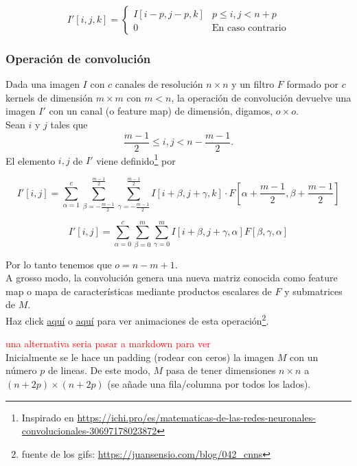\documentclass{article}
\begin{document}
$$I'[i,j,k]=\begin{cases}
  I[i-p,j-p,k] & p\leq i,j<n+p\\
  0 & \text{En caso contrario}
\end{cases} $$


\subsubsection{Operación de convolución}
Dada una imagen $I$ con $c$ canales de resolución $n\times n$ y un filtro $F$ formado por $c$ kernels de dimensión $m\times m$ con $m<n$, la operación de convolución devuelve una imagen $I'$ con un canal (o feature map) de dimensión, digamos, $o\times o$.\\


Sean $i$ y $j$ tales que 
$$\frac{m-1}{2}\leq i,j<n-\frac{m-1}{2}. $$
El elemento $i,j$ de $I'$ viene definido\footnote{Inspirado en \url{https://ichi.pro/es/matematicas-de-las-redes-neuronales-convolucionales-30697178023872}} por

$$I'[i,j]=\sum_{\alpha=1}^c \sum_{\beta=-\frac{m-1}{2}}^{\frac{m-1}{2}}\sum_{\gamma=-\frac{m-1}{2}}^{\frac{m-1}{2}} I[i+\beta,j+\gamma,k]\cdot F\left[\alpha+\frac{m-1}{2},\beta+\frac{m-1}{2}\right]  $$

$$I'[i,j]=\sum_{\alpha=0}^c \sum_{\beta=0}^m \sum_{\gamma=0}^m I[i+\beta,j+\gamma,\alpha] F[\beta,\gamma,\alpha]$$

Por lo tanto tenemos que  $o= n-m+1 $.\\
 
A grosso modo, la convolución genera una nueva matriz conocida como feature map o mapa de características mediante productos escalares de $F$ y submatrices de $M$.\\


Haz click \href{https://miro.medium.com/max/1052/1*GcI7G-JLAQiEoCON7xFbhg.gif}{aquí} o \href{https://cdn-media-1.freecodecamp.org/images/gb08-2i83P5wPzs3SL-vosNb6Iur5kb5ZH43}{aquí} para ver animaciones de esta operación\footnote{fuente de los gifs: \url{https://juansensio.com/blog/042_cnns}}.

\textcolor{red}{una alternativa seria pasar a markdown para ver }\\

Inicialmente se le hace un padding (rodear con ceros) la imagen $M$ con un número $p$ de lineas. De este modo, $M$ pasa de tener dimensiones $n\times n$ a $(n+2p)\times (n+2p) $ (se añade una fila/columna por todos los lados).\\
\end{document}
